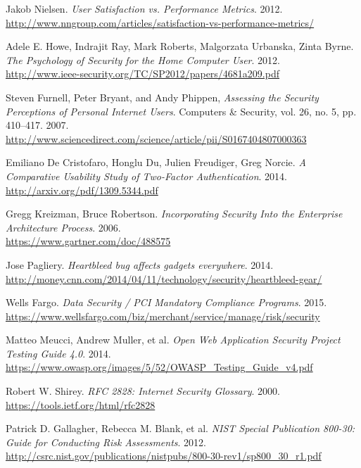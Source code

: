 \documentclass[a4paper,12pt]{article}
\begin{document}
\begin{thebibliography}{}
		Jakob Nielsen. \textit{User Satisfaction vs. Performance Metrics}. 2012.\\
		\url{http://www.nngroup.com/articles/satisfaction-vs-performance-metrics/}
		
		Adele E. Howe, Indrajit Ray, Mark Roberts, Malgorzata Urbanska, Zinta Byrne. \textit{The Psychology of Security for the Home Computer User}. 2012.\\
		\url{http://www.ieee-security.org/TC/SP2012/papers/4681a209.pdf}
		
		Steven Furnell, Peter Bryant, and Andy Phippen, \textit{Assessing the Security Perceptions of Personal Internet Users}. Computers \& Security, vol. 26, no. 5, pp. 410–417. 2007.\\
		\url{http://www.sciencedirect.com/science/article/pii/S0167404807000363}
		
		Emiliano De Cristofaro, Honglu Du, Julien Freudiger, Greg Norcie. \textit{A Comparative Usability Study of Two-Factor Authentication}. 2014.\\
		\url{http://arxiv.org/pdf/1309.5344.pdf}
		
		Gregg Kreizman, Bruce Robertson. \textit{Incorporating Security Into the Enterprise Architecture Process}. 2006.\\
		\url{https://www.gartner.com/doc/488575}
		
		Jose Pagliery. \textit{Heartbleed bug affects gadgets everywhere}. 2014.\\
		\url{http://money.cnn.com/2014/04/11/technology/security/heartbleed-gear/}
		
		Wells Fargo. \textit{Data Security / PCI Mandatory Compliance Programs}. 2015.\\
		\url{https://www.wellsfargo.com/biz/merchant/service/manage/risk/security}
		
		Matteo Meucci, Andrew Muller, et al. \textit{Open Web Application Security Project Testing Guide 4.0}. 2014.\\
		\url{https://www.owasp.org/images/5/52/OWASP_Testing_Guide_v4.pdf}
		
		Robert W. Shirey. \textit{RFC 2828: Internet Security Glossary}. 2000.\\
		\url{https://tools.ietf.org/html/rfc2828}
		
		Patrick D. Gallagher, Rebecca M. Blank, et al. \textit{NIST Special Publication 800-30: Guide for Conducting Risk Assessments}. 2012.\\
		\url{http://csrc.nist.gov/publications/nistpubs/800-30-rev1/sp800_30_r1.pdf}
		

\end{thebibliography}
\end{document}
